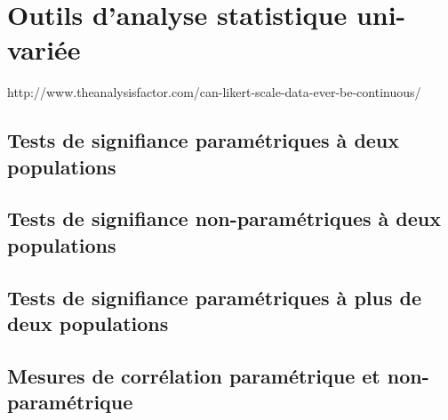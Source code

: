 \chapter{Outils d'analyse statistique uni-variée}
\label{app:statuni}

http://www.theanalysisfactor.com/can-likert-scale-data-ever-be-continuous/

\section{Tests de signifiance paramétriques à deux populations}

\section{Tests de signifiance non-paramétriques à deux populations}

\section{Tests de signifiance paramétriques à plus de deux populations}

\section{Mesures de corrélation paramétrique et non-paramétrique}
\label{app:corr}
